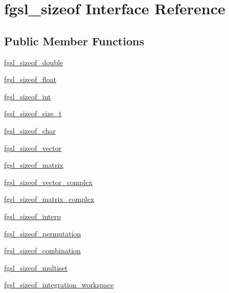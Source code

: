 \hypertarget{interfacefgsl__sizeof}{}\section{fgsl\+\_\+sizeof Interface Reference}
\label{interfacefgsl__sizeof}
\subsection*{Public Member Functions}
\begin{DoxyCompactItemize}
\item 
\hyperlink{interfacefgsl__sizeof_a09dcf0ba3c399bf4180e068fcc51411b}{fgsl\+\_\+sizeof\+\_\+double}
\item 
\hyperlink{interfacefgsl__sizeof_a7936cc803801f8937a2d40c7aa833cfc}{fgsl\+\_\+sizeof\+\_\+float}
\item 
\hyperlink{interfacefgsl__sizeof_a333c65a82acaa67a814b9b6e09882a17}{fgsl\+\_\+sizeof\+\_\+int}
\item 
\hyperlink{interfacefgsl__sizeof_a6586ee7f0da543a3c7fe825a2f93c1ed}{fgsl\+\_\+sizeof\+\_\+size\+\_\+t}
\item 
\hyperlink{interfacefgsl__sizeof_a357f3f65f86d535f570769027a727b4e}{fgsl\+\_\+sizeof\+\_\+char}
\item 
\hyperlink{interfacefgsl__sizeof_afaff3b5eb24e4ccbe72031bdfa91e14f}{fgsl\+\_\+sizeof\+\_\+vector}
\item 
\hyperlink{interfacefgsl__sizeof_aa0a1ae56e5ae76ebd04c2b39ea8def4e}{fgsl\+\_\+sizeof\+\_\+matrix}
\item 
\hyperlink{interfacefgsl__sizeof_a4ba7154a64a65acbd3f7c97be257cb40}{fgsl\+\_\+sizeof\+\_\+vector\+\_\+complex}
\item 
\hyperlink{interfacefgsl__sizeof_a19e97a760e18face06868c597950f7c3}{fgsl\+\_\+sizeof\+\_\+matrix\+\_\+complex}
\item 
\hyperlink{interfacefgsl__sizeof_a1f6b503a6666f577ef97b17b715ad66a}{fgsl\+\_\+sizeof\+\_\+interp}
\item 
\hyperlink{interfacefgsl__sizeof_a6c1ac48c8524f61d28d906460ab9069c}{fgsl\+\_\+sizeof\+\_\+permutation}
\item 
\hyperlink{interfacefgsl__sizeof_a9ec0415509f4a420702f70eee66b0307}{fgsl\+\_\+sizeof\+\_\+combination}
\item 
\hyperlink{interfacefgsl__sizeof_a669cd8ded29c87b3649014de8ef5bb10}{fgsl\+\_\+sizeof\+\_\+multiset}
\item 
\hyperlink{interfacefgsl__sizeof_a58c8a6d2b7550b2ee309768abc134f70}{fgsl\+\_\+sizeof\+\_\+integration\+\_\+workspace}

\end{DoxyCompactItemize}
